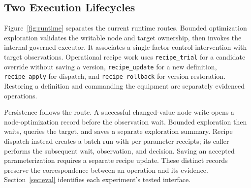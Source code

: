 \subsection{Two Execution Lifecycles}
\label{sec:tasklifecycle}
Figure~\ref{fig:runtime} separates the current runtime routes. Bounded
optimization exploration validates the writable node and target ownership,
then invokes the internal governed executor. It associates a single-factor
control intervention with target observations. Operational recipe work
uses \texttt{recipe\_trial} for a candidate override without saving a
version, \texttt{recipe\_update} for a new definition,
\texttt{recipe\_apply} for dispatch, and \texttt{recipe\_rollback} for
version restoration. Restoring a definition and commanding the equipment
are separately evidenced operations.

Persistence follows the route. A successful changed-value node write opens
a node-optimization record before the observation wait. Bounded exploration
then waits, queries the target, and saves a separate exploration summary.
Recipe dispatch instead creates a batch run with per-parameter receipts;
its caller performs the subsequent wait, observation, and decision. Saving
an accepted parameterization requires a separate recipe update. These
distinct records preserve the correspondence between an operation and its
evidence. Section~\ref{sec:eval} identifies each experiment's tested interface.

